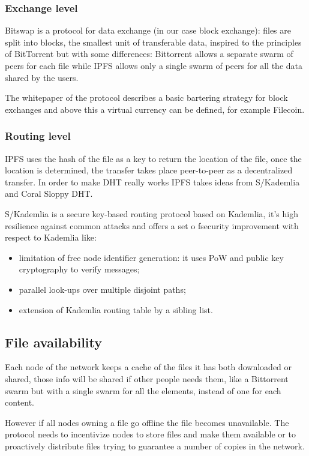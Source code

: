 \subsubsection{Exchange level}
Bitswap is a protocol for data exchange (in our case block exchange): files are split into blocks, the smallest unit of transferable data, inspired to the principles of BitTorrent but with some differences: Bittorrent allows a separate swarm of peers for each file while IPFS allows only a single swarm of peers for all the data shared by the users.

The whitepaper of the protocol describes a basic bartering strategy for block exchanges and above this a virtual currency can be defined, for example Filecoin.

\subsubsection{Routing level}
IPFS uses the hash of the file as a key to return the location of the file, once the location is determined, the transfer takes place peer-to-peer as a decentralized transfer.
In order to make DHT really works IPFS takes ideas from S/Kademlia and Coral Sloppy DHT.

S/Kademlia is a secure key-based routing protocol based on Kademlia, it's high resilience against common attacks and offers a set o fsecurity improvement with respect to Kademlia like:
\begin{itemize}
    \item limitation of free node identifier generation: it uses PoW and public key cryptography to verify messages;
    \item parallel look-ups over multiple disjoint paths;
    \item extension of Kademlia routing table by a sibling list.
\end{itemize}

\subsection{File availability}
Each node of the network keeps a cache of the files it has both downloaded or shared, those info will be shared if other people needs them, like a Bittorrent swarm but with a single swarm for all the elements, instead of one for each content.

However if all nodes owning a file go offline the file becomes unavailable.
The protocol needs to incentivize nodes to store files and make them available or to proactively distribute files trying to guarantee a number of copies in the network.

